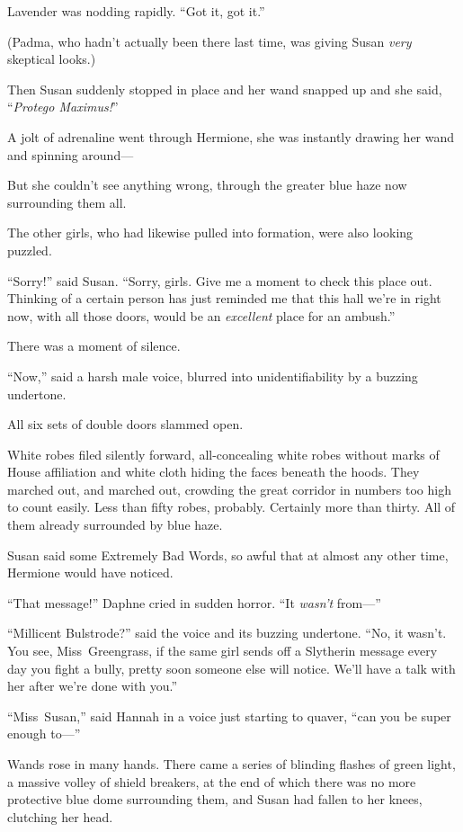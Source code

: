 Lavender was nodding rapidly. “Got it, got it.”

(Padma, who hadn’t actually been there last time, was giving Susan \emph{very} skeptical looks.)

Then Susan suddenly stopped in place and her wand snapped up and she said, “\emph{Protego Maximus!}”

A jolt of adrenaline went through Hermione, she was instantly drawing her wand and spinning around—

But she couldn’t see anything wrong, through the greater blue haze now surrounding them all.

The other girls, who had likewise pulled into formation, were also looking puzzled.

“Sorry!” said Susan. “Sorry, girls. Give me a moment to check this place out. Thinking of a certain person has just reminded me that this hall we’re in right now, with all those doors, would be an \emph{excellent} place for an ambush.”

There was a moment of silence.

“Now,” said a harsh male voice, blurred into unidentifiability by a buzzing undertone.

All six sets of double doors slammed open.

White robes filed silently forward, all-concealing white robes without marks of House affiliation and white cloth hiding the faces beneath the hoods. They marched out, and marched out, crowding the great corridor in numbers too high to count easily. Less than fifty robes, probably. Certainly more than thirty. All of them already surrounded by blue haze.

Susan said some Extremely Bad Words, so awful that at almost any other time, Hermione would have noticed.

“That message!” Daphne cried in sudden horror. “It \emph{wasn’t} from—”

“Millicent Bulstrode?” said the voice and its buzzing undertone. “No, it wasn’t. You see, Miss~Greengrass, if the same girl sends off a Slytherin message every day you fight a bully, pretty soon someone else will notice. We’ll have a talk with her after we’re done with you.”

“Miss~Susan,” said Hannah in a voice just starting to quaver, “can you be super enough to—”

Wands rose in many hands. There came a series of blinding flashes of green light, a massive volley of shield breakers, at the end of which there was no more protective blue dome surrounding them, and Susan had fallen to her knees, clutching her head.

